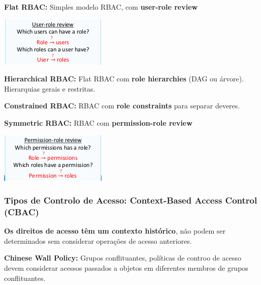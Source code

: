 \documentclass{article}
\begin{document}
\begin{flushleft}
  \textbf{Flat RBAC:} Simples modelo RBAC, com \textbf{user-role review}
  \begin{center}
    \includegraphics[scale=0.6]{17}
  \end{center}

  \vspace{2mm}

  \textbf{Hierarchical RBAC:} Flat RBAC com \textbf{role hierarchies} (DAG ou árvore).
  Hierarquias gerais e restritas.

  \vspace{2mm}

  \textbf{Constrained RBAC:} RBAC com \textbf{role constraints} para separar
  deveres.

  \vspace{2mm}

  \textbf{Symmetric RBAC:} RBAC com \textbf{permission-role review}
  \begin{center}
    \includegraphics[scale=0.6]{18}
  \end{center}
\end{flushleft}

\subsubsection{Tipos de Controlo de Acesso: Context-Based Access Control (CBAC)}

\begin{flushleft}
  \textbf{Os direitos de acesso têm um contexto histórico}, não podem ser
  determinados sem considerar operações de acesso anteriores.

  \vspace{2mm}

  \textbf{Chinese Wall Policy:} Grupos conflituantes, políticas de controo de acesso
  devem considerar acessos passados a objetos em diferentes membros de grupos conflituantes.
\end{flushleft}
\end{document}
